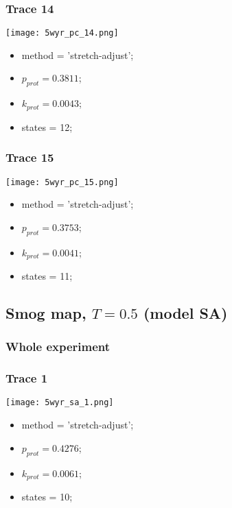 \subsubsection{Trace 14}
\begin{minipage}[c]{0.7\textwidth}
    \texttt{[image: 5wyr\_pc\_14.png]}
\end{minipage}
\hfill
\begin{minipage}[c]{0.45\textwidth}
    \begin{itemize}
        \item method = 'stretch-adjust';
        \item $p_{prot}=0.3811$;
        \item $k_{prot}=0.0043$;
        \item states = 12;
    \end{itemize}
\end{minipage}

\subsubsection{Trace 15}
\begin{minipage}[c]{0.7\textwidth}
    \texttt{[image: 5wyr\_pc\_15.png]}
\end{minipage}
\hfill
\begin{minipage}[c]{0.45\textwidth}
    \begin{itemize}
        \item method = 'stretch-adjust';
        \item $p_{prot}=0.3753$;
        \item $k_{prot}=0.0041$;
        \item states = 11;
    \end{itemize}
\end{minipage}

\subsection{Smog map, $T=0.5$ (model SA)}
\subsubsection{Whole experiment}

\subsubsection{Trace 1}
\begin{minipage}[c]{0.7\textwidth}
    \texttt{[image: 5wyr\_sa\_1.png]}
\end{minipage}
\hfill
\begin{minipage}[c]{0.45\textwidth}
    \begin{itemize}
        \item method = 'stretch-adjust';
        \item $p_{prot}=0.4276$;
        \item $k_{prot}=0.0061$;
        \item states = 10;
    \end{itemize}
\end{minipage}

